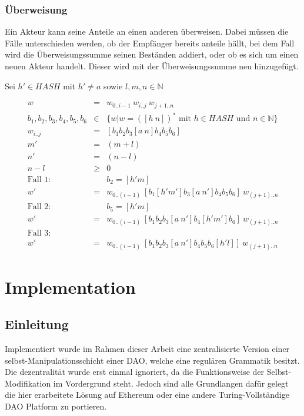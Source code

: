 \documentclass[a4paper,12pt]{report}
\begin{document}
\subsubsection*{Überweisung}

Ein Akteur kann seine Anteile an einen anderen überweisen. Dabei müssen die Fälle unterschieden werden, ob der Empfänger bereits anteile hällt, bei dem Fall wird die Überweisungssumme seinen Beständen addiert, oder ob es sich um einen neuen Akteur handelt. Dieser wird mit der Überweisungssumme neu hinzugefügt. 

Sei $h'\in HASH$ mit $h' \neq a$ sowie $l,m,n\in\mathbb{N}$

\begin{eqnarray}
  w &=& w_{0 .. i-1}\ w_{i..j}\ w_{j+1 .. n} \\
  b_1, b_2, b_3, b_4, b_5, b_6 &\in& \{ w | w = ([h\ n])^*\text{ mit } h \in HASH\text{ und }n\in\mathbb{N} \} \\
  w_{i..j} &=& [ b_1 b_2 b_3 [a\ n] b_4 b_5 b_6 ] \\
  m' &=& (m+l) \\
  n' &=& (n-l) \\
  n - l &\geq& 0\\
  \text{Fall 1: } &&b_2 = [h' m]\\
  w' &=& w_{0 .. (i-1)}\ [ b_1 [h' m'] b_3 [a\ n'] b_4 b_5 b_6 ]\ w_{(j+1) .. n} \\
  \text{Fall 2: } &&b_5 = [h' m]\\
  w' &=& w_{0 .. (i-1)}\ [ b_1 b_2 b_3 [a\ n'] b_4 [h' m'] b_6 ]\ w_{(j+1) .. n}\\
  \text{Fall 3: } && \\
  w' &=& w_{0 .. (i-1)}\ [ b_1 b_2 b_3 [a\ n'] b_4 b_5 b_6 [h' l]]\ w_{(j+1) .. n}
\end{eqnarray}



\section{Implementation}
\subsection*{Einleitung}
Implementiert wurde im Rahmen dieser Arbeit eine zentralisierte Version einer selbst-Manipulationsschicht einer DAO, welche eine regulären Grammatik besitzt. Die dezentralität wurde erst einmal ignoriert, da die Funktionsweise der Selbst-Modifikation im Vordergrund steht. Jedoch sind alle Grundlangen dafür gelegt die hier erarbeitete Lösung auf Ethereum oder eine andere Turing-Vollständige DAO Platform zu portieren.
\end{document}
